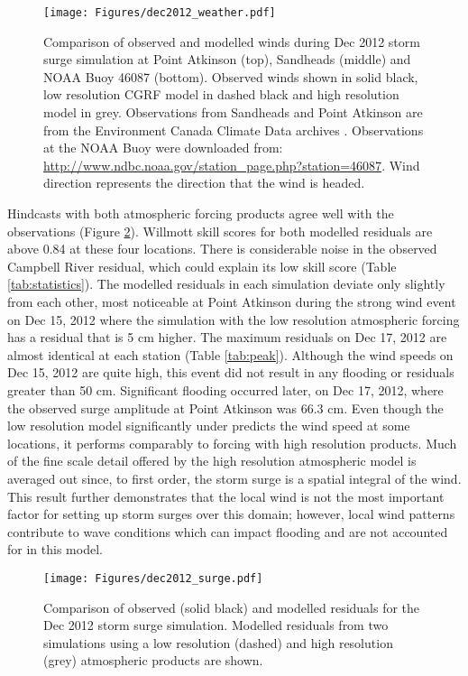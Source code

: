 \documentclass[letterpaper]{tATO2e}
\begin{document}
\begin{figure}
\centering
\texttt{[image: Figures/dec2012\_weather.pdf]}
\caption{{\color{red}Comparison of observed and modelled winds during Dec 2012 storm surge simulation at Point Atkinson (top), Sandheads (middle) and NOAA Buoy 46087 (bottom). Observed winds shown in solid black, low resolution CGRF model in dashed black and high resolution model in grey. Observations from Sandheads and Point Atkinson are from the Environment Canada Climate Data archives \citep{ECClimateArchive}.  Observations at the NOAA Buoy were downloaded from: \url{http://www.ndbc.noaa.gov/station_page.php?station=46087}. Wind direction represents the direction that the wind is headed.} }
\label{fig:dec2012_weather}
\end{figure}

Hindcasts with both atmospheric forcing products agree well with the observations (Figure \ref{fig:dec2012_surge}). Willmott skill scores for both modelled residuals are above {\color{red} 0.84} at these four locations. {\color{red} There is considerable noise in the observed Campbell River residual, which could explain its low skill score (Table \ref{tab:statistics}).} {\color{red} The modelled residuals in each simulation deviate only slightly from each other, most noticeable at Point Atkinson during the strong wind event on Dec 15, 2012 where the simulation with the low resolution atmospheric forcing has a residual that is 5 cm higher.  The maximum residuals on Dec 17, 2012 are almost identical at each station (Table \ref{tab:peak}).} Although the wind speeds on Dec 15, 2012 are quite high, this event did not result in any flooding or residuals greater than 50 cm. Significant flooding occurred later, on Dec 17, 2012, where the observed surge amplitude at Point Atkinson was {\color{red}66.3 cm}. Even though the low resolution model significantly under predicts the wind speed at some locations, it performs comparably to forcing with high resolution products. Much of the fine scale detail offered by the high resolution atmospheric model is averaged out since, to first order, the storm surge is a spatial integral of the wind. This result further demonstrates that the local wind is not the most important factor for setting up storm surges over this domain; however, local wind patterns contribute to wave conditions which can impact flooding and are not accounted for in this model. 

\begin{figure}
\centering
\texttt{[image: Figures/dec2012\_surge.pdf]}
\caption{Comparison of observed (solid black) and modelled residuals for the Dec 2012 storm surge simulation. Modelled residuals from two simulations using a low resolution (dashed) and high resolution (grey) atmospheric products are shown. }
\label{fig:dec2012_surge}
\end{figure}
\end{document}
